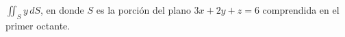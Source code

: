 \item $\iint_S y \, dS$, en donde $S$ es la porción del plano $3x + 2y + z = 6$ comprendida en el primer octante.
